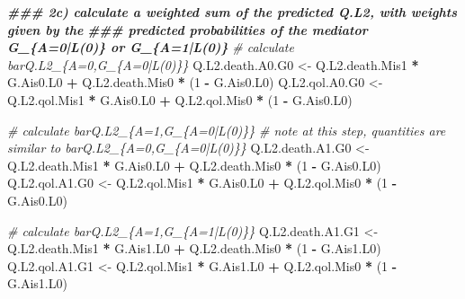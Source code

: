 \documentclass[
]{book}
\newenvironment{Shaded}{\begin{snugshade}}{\end{snugshade}}
\newcommand{\CommentTok}[1]{\textcolor[rgb]{0.56,0.35,0.01}{\textit{#1}}}
\newcommand{\DecValTok}[1]{\textcolor[rgb]{0.00,0.00,0.81}{#1}}
\newcommand{\DocumentationTok}[1]{\textcolor[rgb]{0.56,0.35,0.01}{\textbf{\textit{#1}}}}
\newcommand{\NormalTok}[1]{#1}
\newcommand{\OtherTok}[1]{\textcolor[rgb]{0.56,0.35,0.01}{#1}}
\newcommand{\SpecialCharTok}[1]{\textcolor[rgb]{0.81,0.36,0.00}{\textbf{#1}}}
\begin{document}
\begin{Shaded}
\begin{Highlighting}[]
\DocumentationTok{\#\#\# 2c) calculate a weighted sum of the predicted Q.L2, with weights given by the}
\DocumentationTok{\#\#\#     predicted probabilities of the mediator G\_\{A=0|L(0)\} or G\_\{A=1|L(0)\}}
\CommentTok{\# calculate barQ.L2\_\{A=0,G\_\{A=0|L(0)\}\}}
\NormalTok{Q.L2.death.A0.G0 }\OtherTok{\textless{}{-}}\NormalTok{ Q.L2.death.Mis1 }\SpecialCharTok{*}\NormalTok{ G.Ais0.L0 }\SpecialCharTok{+}\NormalTok{ Q.L2.death.Mis0 }\SpecialCharTok{*}\NormalTok{ (}\DecValTok{1} \SpecialCharTok{{-}}\NormalTok{ G.Ais0.L0)}
\NormalTok{Q.L2.qol.A0.G0 }\OtherTok{\textless{}{-}}\NormalTok{ Q.L2.qol.Mis1 }\SpecialCharTok{*}\NormalTok{ G.Ais0.L0 }\SpecialCharTok{+}\NormalTok{ Q.L2.qol.Mis0 }\SpecialCharTok{*}\NormalTok{ (}\DecValTok{1} \SpecialCharTok{{-}}\NormalTok{ G.Ais0.L0)}

\CommentTok{\# calculate barQ.L2\_\{A=1,G\_\{A=0|L(0)\}\}}
\CommentTok{\# note at this step, quantities are similar to barQ.L2\_\{A=0,G\_\{A=0|L(0)\}\}}
\NormalTok{Q.L2.death.A1.G0 }\OtherTok{\textless{}{-}}\NormalTok{ Q.L2.death.Mis1 }\SpecialCharTok{*}\NormalTok{ G.Ais0.L0 }\SpecialCharTok{+}\NormalTok{ Q.L2.death.Mis0 }\SpecialCharTok{*}\NormalTok{ (}\DecValTok{1} \SpecialCharTok{{-}}\NormalTok{ G.Ais0.L0)}
\NormalTok{Q.L2.qol.A1.G0 }\OtherTok{\textless{}{-}}\NormalTok{ Q.L2.qol.Mis1 }\SpecialCharTok{*}\NormalTok{ G.Ais0.L0 }\SpecialCharTok{+}\NormalTok{ Q.L2.qol.Mis0 }\SpecialCharTok{*}\NormalTok{ (}\DecValTok{1} \SpecialCharTok{{-}}\NormalTok{ G.Ais0.L0)}

\CommentTok{\# calculate barQ.L2\_\{A=1,G\_\{A=1|L(0)\}\}}
\NormalTok{Q.L2.death.A1.G1 }\OtherTok{\textless{}{-}}\NormalTok{ Q.L2.death.Mis1 }\SpecialCharTok{*}\NormalTok{ G.Ais1.L0 }\SpecialCharTok{+}\NormalTok{ Q.L2.death.Mis0 }\SpecialCharTok{*}\NormalTok{ (}\DecValTok{1} \SpecialCharTok{{-}}\NormalTok{ G.Ais1.L0)}
\NormalTok{Q.L2.qol.A1.G1 }\OtherTok{\textless{}{-}}\NormalTok{ Q.L2.qol.Mis1 }\SpecialCharTok{*}\NormalTok{ G.Ais1.L0 }\SpecialCharTok{+}\NormalTok{ Q.L2.qol.Mis0 }\SpecialCharTok{*}\NormalTok{ (}\DecValTok{1} \SpecialCharTok{{-}}\NormalTok{ G.Ais1.L0)}


\end{Highlighting}
\end{Shaded}
\end{document}

